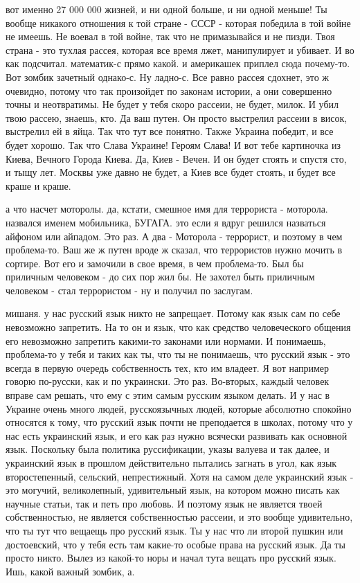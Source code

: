 вот именно 27 000 000 жизней, и ни одной больше, и ни одной меньше! Ты вообще
никакого отношения к той стране - СССР - которая победила в той войне не
имеешь. Не воевал в той войне, так что не примазывайся и не пизди. Твоя страна
- это тухлая рассея, которая все время лжет, манипулирует и убивает. И во как
подсчитал. математик-с прямо какой. и америкашек приплел сюда почему-то. Вот
зомбик зачетный однако-с. Ну ладно-с. Все равно рассея сдохнет, это ж очевидно,
потому что так произойдет по законам истории, а они совершенно точны и
неотвратимы. Не будет у тебя скоро рассеии, не будет, милок. И убил твою
рассею, знаешь, кто. Да ваш путен. Он просто выстрелил рассеии в висок,
выстрелил ей в яйца. Так что тут все понятно. Также Украина победит, и все
будет хорошо. Так что Слава Украине! Героям Слава! И вот тебе картиночка из
Киева, Вечного Города Киева. Да, Киев - Вечен. И он будет стоять и спустя сто,
и тыщу лет. Москвы уже давно не будет, а Киев все будет стоять, и будет все
краше и краше.

а что насчет моторолы. да, кстати, смешное имя для террориста - моторола.
назвался именем мобильника, БУГАГА. это если я вдруг решился назваться айфоном
или айпадом. Это раз. А два - Моторола - террорист, и поэтому в чем
проблема-то. Ваш же ж путен вроде ж сказал, что террористов нужно мочить в
сортире. Вот его и замочили в свое время, в чем проблема-то. Был бы приличным
человеком - до сих пор жил бы. Не захотел быть приличным человеком - стал
террористом - ну и получил по заслугам.

мишаня. у нас русский язык никто не запрещает. Потому как язык сам по себе
невозможно запретить. На то он и язык, что как средство человеческого общения
его невозможно запретить какими-то законами или нормами. И понимаешь,
проблема-то у тебя и таких как ты, что ты не понимаешь, что русский язык - это
всегда в первую очередь собственность тех, кто им владеет. Я вот например
говорю по-русски, как и по украински. Это раз. Во-вторых, каждый человек вправе
сам решать, что ему с этим самым русским языком делать. И у нас в Украине очень
много людей, русскоязычных людей, которые абсолютно спокойно относятся к тому,
что русский язык почти не преподается в школах, потому что у нас есть
украинский язык, и его как раз нужно всячески развивать как основной язык.
Поскольку была политика руссификации, указы валуева и так далее, и украинский
язык в прошлом действительно пытались загнать в угол, как язык второстепенный,
сельский, непрестижный. Хотя на самом деле украинский язык - это могучий,
великолепный, удивительный язык, на котором можно писать как научные статьи,
так и петь про любовь. И поэтому язык не является твоей собственностью, не
является собственностью рассеии, и это вообще удивительно, что ты тут что
вещаещь про русский язык. Ты у нас что ли второй пушкин или достоевский, что у
тебя есть там какие-то особые права на русский язык. Да ты просто никто. Вылез
из какой-то норы и начал тута вещать про русский язык. Ишь, какой важный
зомбик, а.


